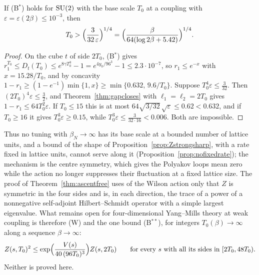 \begin{corollary}\label{cor:basescale}
If \textup{(B$^*$)} holds for $\mathrm{SU}(2)$ with the base scale $T_0$ at a
coupling with $\varepsilon=\varepsilon(2\beta)\le10^{-3}$, then
\[
T_0>\Bigl(\frac3{32\,\varepsilon}\Bigr)^{1/4}=\Bigl(\frac{\beta}{64(\log2\beta
+5.42)}\Bigr)^{1/4}.
\]
\end{corollary}

\begin{proof}
On the cube $t$ of side $2T_0$, (B$^*$) gives $r_1^{T_0}\le D_t(T_0)\le e^{8
\gamma T_0^3}-1=e^{4y_0/96^3}-1\le2.3\cdot10^{-7}$, so $r_1\le e^{-x}$ with $x=
15.28/T_0$, and by concavity $1-r_1\ge(1-e^{-1})\min\{1,x\}\ge\min\{0.632,\,
9.6/T_0\}$. Suppose $T_0^4\varepsilon\le\frac3{32}$. Then $(2T_0)^4\varepsilon
\le\frac32$, and Theorem~\ref{thm:gapcloses} with $\ell_1=\ell_2=2T_0$ gives
$1-r_1\le64T_0^2\varepsilon$. If $T_0\le15$ this is at most $64\sqrt{3/32}\,
\sqrt\varepsilon\le0.62<0.632$, and if $T_0\ge16$ it gives $T_0^3\varepsilon
\ge0.15$, while $T_0^3\varepsilon\le\frac3{32\cdot16}<0.006$. Both are
impossible.
\end{proof}

Thus no tuning with $\beta_N\to\infty$ has its base scale at a bounded
number of lattice units, and a bound of the shape of
Proposition~\ref{prop:Zstrongsharp}, with a rate fixed in lattice units,
cannot serve along it (Proposition~\ref{prop:nofixedrate}); the mechanism
is the centre symmetry, which gives the Polyakov loops mean zero while the
action no longer suppresses their fluctuation at a fixed lattice size. The
proof of Theorem~\ref{thm:ascentfree} uses of the Wilson action only that
$Z$ is symmetric in the four sides and is, in each direction, the trace of
a power of a nonnegative self-adjoint Hilbert--Schmidt operator with a
simple largest eigenvalue.
What remains open for four-dimensional Yang--Mills theory at weak coupling
is therefore (W) and the one bound \textup{(B$^{**}$)}, for integers $T_0
(\beta)\to\infty$ along a sequence $\beta\to\infty$:
\[
Z(s,T_0)^2\le\exp\Bigl(\frac{V(s)}{40\,(96T_0)^3}\Bigr)Z(s,2T_0)\qquad
\text{for every }s\text{ with all its sides in }[2T_0,48T_0).
\]
Neither is proved here.
